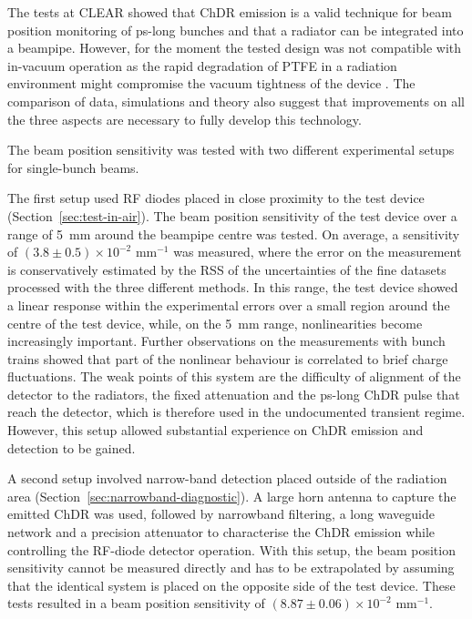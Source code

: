 The tests at CLEAR showed that ChDR emission is a valid technique for beam position monitoring of ps-long bunches and that a radiator can be integrated into a beampipe. However, for the moment the tested design was not compatible with in-vacuum operation as the rapid degradation of PTFE in a radiation environment might compromise the vacuum tightness of the device \cite{PTFE:no-vac}. The comparison of data, simulations and theory also suggest that improvements on all the three aspects are necessary to fully develop this technology.

The beam position sensitivity was tested with two different experimental setups for single-bunch beams. 

The first setup used RF diodes placed in close proximity to the test device  (Section~\ref{sec:test-in-air}). The beam position sensitivity of the test device over a range of 5~mm around the beampipe centre was tested. On average, a sensitivity of  ${(3.8\pm0.5) \times 10^{-2}\text{ mm}^{-1}}$ was measured, where the error on the measurement is conservatively estimated by the RSS of the uncertainties of the fine datasets processed with the three different methods. In this range, the test device showed a linear response within the experimental errors over a small region around the centre of the test device, while, on the 5~mm range, nonlinearities become increasingly important. Further observations on the measurements with bunch trains showed that part of the nonlinear behaviour is correlated to brief charge fluctuations. The weak points of this system are the difficulty of alignment of the detector to the radiators, the fixed attenuation and the ps-long ChDR pulse that reach the detector, which is therefore used in the undocumented transient regime. However, this setup allowed substantial experience on ChDR emission and detection to be gained.

A second setup involved narrow-band detection placed outside of the radiation area (Section~\ref{sec:narrowband-diagnostic}). A large horn antenna to capture the emitted ChDR was used, followed by narrowband filtering, a long waveguide network and a precision attenuator to characterise the ChDR emission while controlling the RF-diode detector operation. With this setup, the beam position sensitivity cannot be measured directly and has to be extrapolated by assuming that the identical system is placed on the opposite side of the test device. These tests resulted in a beam position sensitivity of ${(8.87\pm0.06) \times 10^{-2}\text{ mm}^{-1}}$.






